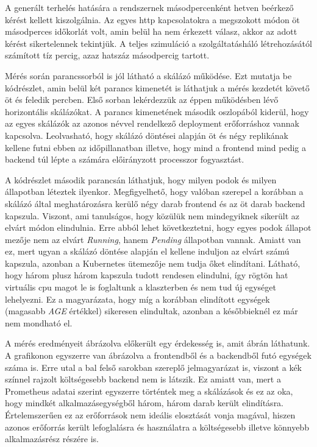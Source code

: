 A generált terhelés hatására a rendszernek másodpercenként hetven beérkező kérést kellett kiszolgálnia. 
Az egyes http kapcsolatokra a megszokott módon öt másodperces időkorlát volt, amin belül ha nem érkezett válasz, akkor az adott kérést sikertelennek tekintjük.
A teljes szimuláció a szolgáltatásháló létrehozásától számított tíz percig, azaz hatszáz másodpercig tartott.

Mérés során parancssorból is jól látható a skálázó működése. 
Ezt mutatja be  kódrészlet, amin belül két parancs kimenetét is láthatjuk a mérés kezdetét követő öt és feledik percben.
Első sorban lekérdezzük az éppen működésben lévő horizontális skálázókat. 
A parancs kimenetének második oszlopából kiderül, hogy az egyes skálázók az azonos névvel rendelkező deployment erőforráshoz vannak kapcsolva.
Leolvasható, hogy skálázó döntései alapján öt és négy replikának kellene futni ebben az időpillanatban illetve, hogy mind a frontend mind pedig a backend túl lépte a számára előirányzott processzor fogyasztást.

A kódrészlet második parancsán láthatjuk, hogy milyen podok és milyen állapotban léteztek ilyenkor.
Megfigyelhető, hogy valóban szerepel a korábban a skálázó által meghatározásra kerülő négy darab frontend és az öt darab backend kapszula.
Viszont, ami tanulságos, hogy közülük nem mindegyiknek sikerült az elvárt módon elindulnia.
Erre abból lehet következtetni, hogy egyes podok állapot mezője nem az elvárt \textit{Running}, hanem \textit{Pending} állapotban vannak.
Amiatt van ez, mert ugyan a skálázó döntése alapján el kellene induljon az elvárt számú kapszula, azonban a Kubernetes ütemezője nem tudja őket elindítani.
Látható, hogy három plusz három kapszula tudott rendesen elindulni, így rögtön hat virtuális cpu magot le is foglaltunk a klaszterben és nem tud új egységet lehelyezni.
Ez a magyarázata, hogy míg a korábban elindított egységek (magasabb \textit{AGE} értékkel) sikeresen elindultak, azonban a későbbieknél ez már nem mondható el.

\lstset{caption=Horizontális skálázóval történő mérés, label=hpa_measurement_pending}


A mérés eredményeit ábrázolva előkerült egy érdekesség is, amit  ábrán láthatunk.
A grafikonon egyszerre van ábrázolva a frontendből és a backendből futó egységek száma is.
Erre utal a bal felső sarokban szereplő jelmagyarázat is, viszont a kék színnel rajzolt költségesebb backend nem is látszik.
Ez amiatt van, mert a Prometheus adatai szerint egyszerre történtek meg a skálázások és ez az oka, hogy mindkét alkalmazásegységből három, három darab került elindításra.
Értelemszerűen ez az erőforrások nem ideális elosztását vonja magával, hiszen azonos erőforrás került lefoglalásra és használatra a költségesebb illetve könnyebb alkalmazásrész részére is.

